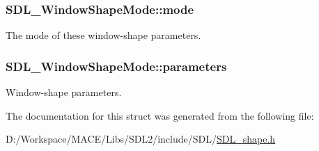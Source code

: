 \subsubsection[{\texorpdfstring{mode}{mode}}]{ S\+D\+L\+\_\+\+Window\+Shape\+Mode\+::mode}\hypertarget{struct_s_d_l___window_shape_mode_a40ebd8b9a76d982cbd87563386cc05de}{}\label{struct_s_d_l___window_shape_mode_a40ebd8b9a76d982cbd87563386cc05de}


The mode of these window-\/shape parameters. 

\subsubsection[{\texorpdfstring{parameters}{parameters}}]{ S\+D\+L\+\_\+\+Window\+Shape\+Mode\+::parameters}\hypertarget{struct_s_d_l___window_shape_mode_a2f79bb294034156207fa6d88d3a8c819}{}\label{struct_s_d_l___window_shape_mode_a2f79bb294034156207fa6d88d3a8c819}


Window-\/shape parameters. 



The documentation for this struct was generated from the following file\+:\begin{DoxyCompactItemize}
\item 
D\+:/\+Workspace/\+M\+A\+C\+E/\+Libs/\+S\+D\+L2/include/\+S\+D\+L/\hyperlink{_s_d_l__shape_8h}{S\+D\+L\+\_\+shape.\+h}\end{DoxyCompactItemize}
